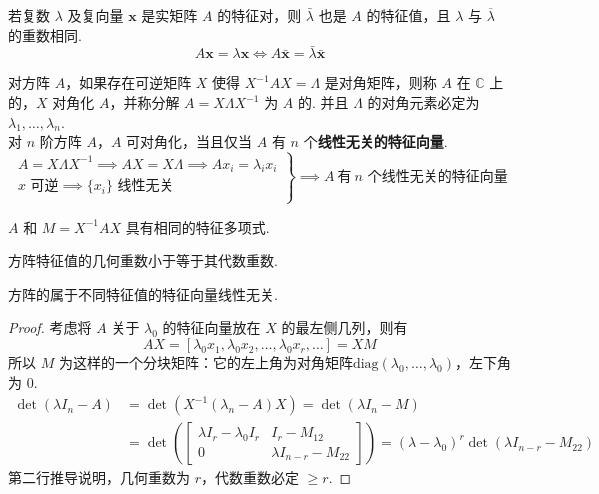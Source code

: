 \documentclass[./main.tex]{subfiles}
\begin{document}
若复数 $\lambda$ 及复向量 $\bm{x}$ 是实矩阵 $A$ 的特征对，则 $\bar{\lambda}$ 也是 $A$ 的特征值，且 $\lambda$ 与 $\overline{\lambda}$ 的重数相同.
\begin{equation}
    A\bm{x}=\lambda\bm{x}\iff A\bar{\bm{x}}=\bar{\lambda}\bar{\bm{x}}
\end{equation}

对方阵 $A$，如果存在可逆矩阵 $X$ 使得 $X^{-1}AX=\Lambda$ 是对角矩阵，则称 $A$ 在 $\mathbb{C}$ 上的，$X$ 对角化 $A$，并称分解 $A=X\Lambda X^{-1}$ 为 $A$ 的. 并且 $\Lambda$ 的对角元素必定为 $\lambda_1,\dots,\lambda_n$.\\

对 $n$ 阶方阵 $A$，$A$ 可对角化，当且仅当 $A$ 有 $n$ 个\textbf{线性无关的特征向量}.
$$
    \left.
    \begin{array}{r}
        A=X\Lambda X^{-1}\implies AX=X\Lambda\implies Ax_i=\lambda_ix_i \\
        x\textit{ 可逆}\implies \{x_i\}\textit{ 线性无关}               \\
    \end{array}
    \right\}\implies A\ \textit{有}\ n \textit{ 个线性无关的特征向量}
$$

\begin{enumerate*}
    \item $A$ 和 $M=X^{-1}AX$ 具有相同的特征多项式.
    \item 方阵特征值的几何重数小于等于其代数重数.
    \item 方阵的属于不同特征值的特征向量线性无关.
\end{enumerate*}
\begin{proof}
    考虑将 $A$ 关于 $\lambda_0$ 的特征向量放在 $X$ 的最左侧几列，则有
    $$AX=[\lambda_0 x_1,\lambda_0 x_2,\dots,\lambda_0 x_r,\dots]=XM$$
    所以 $M$ 为这样的一个分块矩阵：它的左上角为对角矩阵$\text{diag}(\lambda_0,\dots,\lambda_0)$，左下角为 0.
    \begin{align}
        \det(\lambda I_n-A) & =\det(X^{-1}(\lambda_n-A)X)=\det(\lambda I_n-M)                                                \\
                            & =\det\left(\begin{bmatrix}\lambda I_r-\lambda_0 I_r & I_r -M_{12}            \\
                0                         & \lambda I_{n-r}-M_{22}\end{bmatrix}\right)=(\lambda-\lambda_0)^r\det(\lambda I_{n-r}-M_{22})
    \end{align}
    第二行推导说明，几何重数为 $r$，代数重数必定 $\ge r$.
\end{proof}
\end{document}
